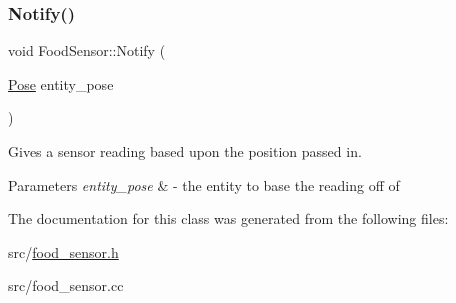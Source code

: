 \subsubsection{\texorpdfstring{Notify()}{Notify()}}
{\footnotesize\ttfamily void Food\+Sensor\+::\+Notify (\begin{DoxyParamCaption}\item[{\mbox{\hyperlink{struct_pose}{Pose}}}]{entity\+\_\+pose }\end{DoxyParamCaption})\hspace{0.3cm}{\ttfamily [override]}}



Gives a sensor reading based upon the position passed in. 


\begin{DoxyParams}{Parameters}
{\em entity\+\_\+pose} & -\/ the entity to base the reading off of \\
\hline
\end{DoxyParams}


The documentation for this class was generated from the following files\+:\begin{DoxyCompactItemize}
\item 
src/\mbox{\hyperlink{food__sensor_8h}{food\+\_\+sensor.\+h}}\item 
src/food\+\_\+sensor.\+cc\end{DoxyCompactItemize}
